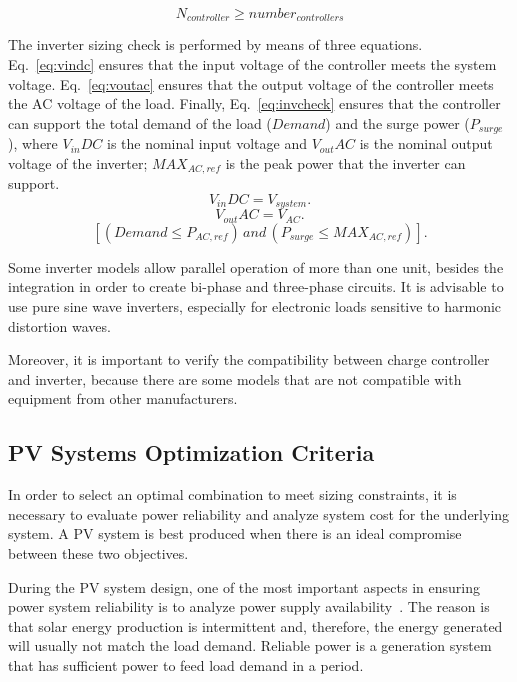 \begin{equation}
\label{eq:numberofc}
N_{controller} \geq number_{controllers}
\end{equation}

The inverter sizing check is performed by means of three equations. Eq.~\eqref{eq:vindc} ensures that 
the input voltage of the controller meets the system voltage. Eq.~\eqref{eq:voutac} ensures that the 
output voltage of the controller meets the AC voltage of the load. Finally, Eq.~\eqref{eq:invcheck} ensures that 
the controller can support the total demand of the load ($Demand$) and the surge power ($P_{surge}$), 
where $V_{in}DC$ is the nominal input voltage and $V_{out}AC$ is the nominal output voltage of the inverter; 
$MAX_{AC,ref}$ is the peak power that the inverter can support.
%
\begin{equation}
\label{eq:vindc} 
V_{in}DC = V_{system}.
\end{equation}
%
\begin{equation}
\label{eq:voutac} 
V_{out}AC = V_{AC}.
\end{equation}
%
\begin{equation}
\label{eq:invcheck} 
\left[ (Demand \leq P_{AC,ref}) \, and \, (P_{surge} \leq MAX_{AC,ref}) \right].
\end{equation}

Some inverter models allow parallel operation of more than one unit, besides the integration in order to create bi-phase and three-phase circuits. It is advisable to use pure sine wave inverters, especially for electronic loads sensitive to harmonic distortion waves.

Moreover, it is important to verify the compatibility between charge controller and inverter, because there are some models that are not compatible with equipment from other manufacturers.


\subsection{PV Systems Optimization Criteria}
\label{sec:optcriteria}

In order to select an optimal combination to meet sizing constraints, 
it is necessary to evaluate power reliability and analyze system cost for the underlying system. A PV system is best produced when there is an ideal compromise between these two objectives.

During the PV system design, one of the most important aspects in ensuring power system reliability is to analyze power supply availability~\cite{Alsadi2018}. The reason is that solar energy production is intermittent and, therefore, the energy generated will usually not match the load demand. Reliable power is a generation system that has sufficient power to feed load demand in a period. 

